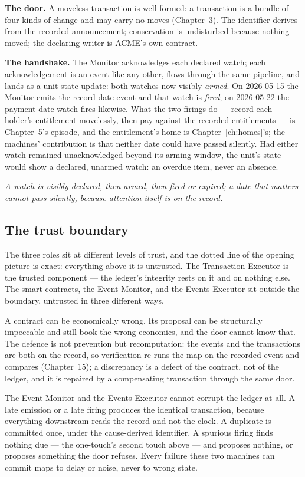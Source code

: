 \textbf{The door.} A moveless transaction is well-formed: a transaction is a
bundle of four kinds of change and may carry no moves (Chapter~3). The
identifier derives from the recorded announcement; conservation is undisturbed
because nothing moved; the declaring writer is ACME's own contract.

\textbf{The handshake.} The Monitor acknowledges each declared watch; each
acknowledgement is an event like any other, flows through the same pipeline,
and lands as a unit-state update: both watches now visibly \emph{armed}. On
2026-05-15 the Monitor emits the record-date event and that watch is
\emph{fired}; on 2026-05-22 the payment-date watch fires likewise. What the two
firings do --- record each holder's entitlement movelessly, then pay against
the recorded entitlements --- is Chapter~5's episode, and the entitlement's
home is Chapter~\ref{ch:homes}'s; the machines' contribution is that neither
date could have passed silently. Had either watch remained unacknowledged
beyond its arming window, the unit's state would show a declared, unarmed
watch: an overdue item, never an absence.

\emph{A watch is visibly declared, then armed, then fired or expired; a date
that matters cannot pass silently, because attention itself is on the record.}

\subsection{The trust boundary}

The three roles sit at different levels of trust, and the dotted line of the
opening picture is exact: everything above it is untrusted. The Transaction
Executor is the trusted component --- the ledger's integrity rests on it and on
nothing else. The smart contracts, the Event Monitor, and the Events Executor
sit outside the boundary, untrusted in three different ways.

A contract can be economically wrong. Its proposal can be structurally
impeccable and still book the wrong economics, and the door cannot know that.
The defence is not prevention but recomputation: the events and the
transactions are both on the record, so verification re-runs the map on the
recorded event and compares (Chapter~15); a discrepancy is a defect of the
contract, not of the ledger, and it is repaired by a compensating transaction
through the same door.

The Event Monitor and the Events Executor cannot corrupt the ledger at all. A
late emission or a late firing produces the identical transaction, because
everything downstream reads the record and not the clock. A duplicate is
committed once, under the cause-derived identifier. A spurious firing finds
nothing due --- the one-touch's second touch above --- and proposes nothing, or
proposes something the door refuses. Every failure these two machines can
commit maps to delay or noise, never to wrong state.

